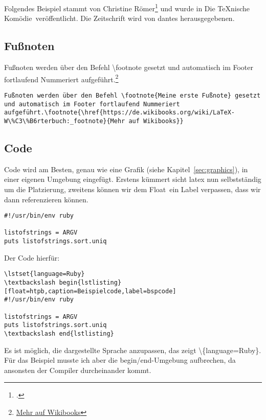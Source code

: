 
Folgendes Beispiel stammt von Christine Römer\footcite{dtk17.1:roemer:tikz} und wurde in \glqq Die \TeX{}nische Komödie\grqq\ veröffentlicht. Die Zeitschrift wird von \glspl{dante} herausgegebenen.
\subsection{Fußnoten}%
\label{sec:footn}
Fußnoten werden über den Befehl \textbackslash footnote gesetzt und automatisch im Footer fortlaufend Nummeriert aufgeführt.\footnote{\href{https://de.wikibooks.org/wiki/LaTeX-W\%C3\%B6rterbuch:_footnote}{Mehr auf Wikibooks}}
\begin{lstlisting}[float=htpb,caption=Das setzen von Fußnoten mit \protect\LaTeX{},label=lst:footnotes]
Fußnoten werden über den Befehl \footnote{Meine erste Fußnote} gesetzt und automatisch im Footer fortlaufend Nummeriert aufgeführt.\footnote{\href{https://de.wikibooks.org/wiki/LaTeX-W\%C3\%B6rterbuch:_footnote}{Mehr auf Wikibooks}}
\end{lstlisting}
\subsection{Code}%
\label{sec:code}
Code wird am Besten, genau wie eine Grafik (siehe Kapitel~\ref{sec:graphics}), in einer eigenen Umgebung eingefügt. Erstens kümmert sicht \gls{latex} nun selbstständig um die Platzierung, zweitens können wir dem \glqq Float\grqq\ ein Label verpassen, dass wir dann referenzieren können.

\lstset{language=Ruby}
\begin{lstlisting}[float=htpb,caption=Beispielcode,label=bspcode]
#!/usr/bin/env ruby

listofstrings = ARGV
puts listofstrings.sort.uniq
\end{lstlisting}

Der Code hierfür:
\begin{lstlisting}[float=htpb,caption=Darstellung eines beliebigen Codes in der Sprache ruby,label=lst:ruby]
\lstset{language=Ruby}
\textbackslash begin{lstlisting}[float=htpb,caption=Beispielcode,label=bspcode]
#!/usr/bin/env ruby

listofstrings = ARGV
puts listofstrings.sort.uniq
\textbackslash end{lstlisting}
\end{lstlisting}
Es ist möglich, die dargestellte Sprache anzupassen, das zeigt \textbackslash\{language=Ruby\}. Für das Beispiel musste ich aber die begin/end-Umgebung aufbrechen, da ansonsten der Compiler durcheinander kommt.

